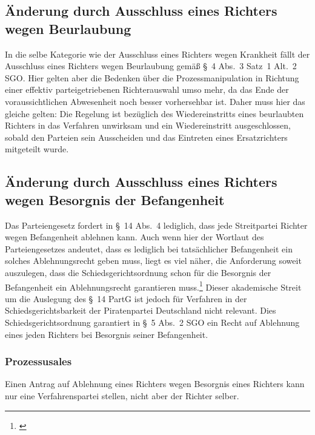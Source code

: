 \subsection{Änderung durch Ausschluss eines Richters wegen Beurlaubung}
\label{Zusammensetzung:Spruchkoerper:Urlaub}
In die selbe Kategorie wie der Ausschluss eines Richters wegen Krankheit fällt der Ausschluss eines Richters wegen Beurlaubung gemäß \S~4 Abs.~3 Satz~1 Alt.~2 SGO.
Hier gelten aber die Bedenken über die Prozessmanipulation in Richtung einer effektiv parteigetriebenen Richterauswahl umso mehr, da das Ende der voraussichtlichen Abwesenheit noch besser vorhersehbar ist.
Daher muss hier das gleiche gelten: Die Regelung ist bezüglich des Wiedereinstritts eines beurlaubten Richters in das Verfahren unwirksam und ein Wiedereinstritt ausgeschlossen, sobald den Parteien sein Ausscheiden und das Eintreten eines Ersatzrichters mitgeteilt wurde.

\subsection{Änderung durch Ausschluss eines Richters wegen Besorgnis der Befangenheit}
\label{Zusammensetzung:Spruchkoerper:Befangenheitsbesorgnis}
Das Parteiengesetz fordert in \S~14 Abs.~4 lediglich, dass jede Streitpartei Richter wegen Befangenheit ablehnen kann.
Auch wenn hier der Wortlaut des Parteiengesetzes andeutet, dass es lediglich bei tatsächlicher Befangenheit ein solches Ablehnungsrecht geben muss, liegt es viel näher, die Anforderung soweit auszulegen, dass die Schiedsgerichtsordnung schon für die Besorgnis der Befangenheit ein Ablehnungsrecht garantieren muss.\footnote{\cites[Wißmann][\S~14 Rn~32]{kersten2007parteiengesetz}[Lenski][\S~14 Rn~23]{lenski2011parteiengesetz}}
Dieser akademische Streit um die Auslegung des \S~14 PartG ist jedoch für Verfahren in der Schiedsgerichtsbarkeit der Piratenpartei Deutschland nicht relevant.
Dies Schiedsgerichtsordnung garantiert in \S~5 Abs.~2 SGO ein Recht auf Ablehnung eines jeden Richters bei Besorgnis seiner Befangenheit.


\subsubsection{Prozessusales}
\label{Zusammensetzung:Spruchkoerper:Befangenheitsbesorgnis:Prozessuales}
Einen Antrag auf Ablehnung eines Richters wegen Besorgnis eines Richters kann nur eine Verfahrenspartei stellen, nicht aber der Richter selber.

